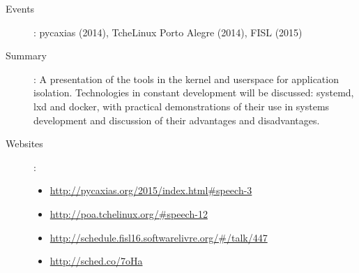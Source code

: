 \begin{description}
    \item[Events]: pycaxias (2014), TcheLinux Porto Alegre (2014), FISL (2015)
    \item[Summary]:
        A presentation of the tools in the kernel and userspace for application
        isolation. Technologies in constant development will be discussed:
        systemd, lxd and docker, with practical demonstrations of their use in
        systems development and discussion of their advantages and
        disadvantages.
    \item[Websites]:
        \begin{itemize}
            \item \url{http://pycaxias.org/2015/index.html#speech-3}
            \item \url{http://poa.tchelinux.org/#speech-12}
            \item \url{http://schedule.fisl16.softwarelivre.org/#/talk/447}
            \item \url{http://sched.co/7oHa}
        \end{itemize}
\end{description}
